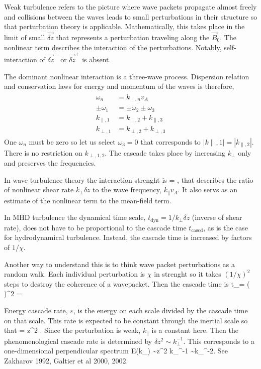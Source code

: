 \documentclass[usenatbib,twocolumn]{aastex63}
\newcommand{\tcascd}{t_\mathrm{cascd}} %
\begin{document}
Weak turbulence refers to the picture where wave packets propagate almost freely and collisions between the waves leads to small perturbations in their structure so that perturbation theory is applicable.
Mathematically, this takes place in the limit of small $\vec{\delta z}$ that represents a perturbation traveling along the $\vec{B}_0$.
The nonlinear term describes the interaction of the perturbations.
Notably, self-interaction of $\vec{\delta z}^-$ or $\vec{\delta z}^+$ is absent.

The dominant nonlinear interaction is a three-wave process.
Dispersion relation and conservation laws for energy and momentum of the waves is therefore,
\begin{align}\begin{split}
    \omega_n &= k_{\parallel,n} v_A \\
    \pm \omega_1 &= \pm \omega_2 \pm \omega_3 \\
    k_{\parallel,1} &= k_{\parallel,2} + k_{\parallel,3} \\
    k_{\perp,1} &= k_{\perp,2} + k_{\perp,3} 
\end{split}\end{align}
One $\omega_n$ must be zero so let us select $\omega_3=0$ that corresponds to $|k{\parallel,1}| = |k_{\parallel,2}|$.
There is no restriction on $k_{\perp,1,2}$.
The cascade takes place by increasing $k_\perp$ only and preserves the frequencies.

In wave turbulence theory the interaction strenght is
\be
\chi = ,
\ee
that describes the ratio of nonlinear shear rate $k_\perp \delta z$ to the wave frequency, $k_\parallel v_A$.
It also servs as an estimate of the nonlinear term to the mean-field term.

In MHD turbulence the dynamical time scale, $t_\mathrm{dyn} = 1/k_\perp \delta z$ (inverse of shear rate), does not have to be proportional to the cascade time $\tcascd$, as is the case for hydrodynamical turbulence.
Instead, the cascade time is increased  by factors of $1/\chi$.

Another way to understand this is to think wave packet perturbations as a random walk.
Each individual perturbation is $\chi$ in strenght so it takes $(1/\chi)^2$ steps to destroy the coherence of a wavepacket.
Then the cascade time is
\be
\tcascd =  \left(  \right)^2 = 
\ee

Energy cascade rate, $\varepsilon$, is the energy on each scale divided by the cascade time on that scale.
This rate is expected to be constant through the inertial scale so that
\be
\epsilon = \delta z^2 .
\ee
Since the perturbation is weak, $k_\parallel$ is a constant here.
Then the phenomenological cascade rate is determined by $\delta z^2 \sim k_\perp^{-1}$.
This corresponds to a one-dimensional perpendicular spectrum
\be
E(k_\perp) \sim \delta z^2 k_\perp^{-1} \sim k_\perp^{-2}.
\ee
See Zakharov 1992, Galtier et al 2000, 2002.
\end{document}
